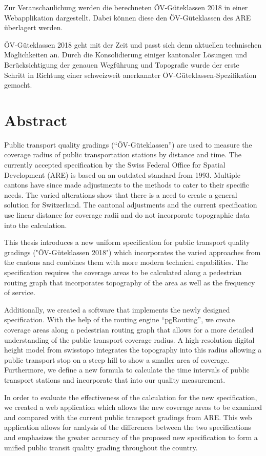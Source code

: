 Zur Veranschaulichung werden die berechneten ÖV-Güteklassen 2018 in einer
Webapplikation dargestellt.
Dabei können diese den ÖV-Güteklassen des ARE überlagert werden.

ÖV-Güteklassen 2018 geht mit der Zeit und passt sich denn aktuellen technischen Möglichkeiten an.
Durch die Konsolidierung einiger kantonaler Lösungen und Berücksichtigung der genauen Wegführung und Topografie wurde der erste Schritt in Richtung einer schweizweit anerkannter ÖV-Güteklassen-Spezifikation gemacht.

\cleardoublepage

\chapter*{Abstract}

Public transport quality gradings ("`ÖV-Güteklassen"') are used to measure the coverage radius of public transportation stations by distance and time.
The currently accepted specification by the Swiss Federal Office for Spatial Development (ARE) is based on an outdated standard from 1993.
Multiple cantons have since made adjustments to the methods to cater to their specific needs.
The varied alterations show that there is a need to create a general solution for Switzerland.
The cantonal adjustments and the current specification use linear distance for coverage radii and do not incorporate topographic data into the calculation.

This thesis introduces a new uniform specification for public transport quality gradings ("ÖV-Güteklassen 2018") which incorporates the varied approaches from the cantons and combines them with more modern technical capabilities.
The specification requires the coverage areas to be calculated along a pedestrian routing graph that incorporates topography of the area as well as the frequency of service.

Additionally, we created a software that implements the newly designed specification.
With the help of the routing engine "`pgRouting"', we create coverage areas along a pedestrian routing graph that allows for a more detailed understanding of the public transport coverage radius.
A high-resolution digital height model from swisstopo integrates the topography into this radius allowing a public transport stop on a steep hill to show a smaller area of coverage.
Furthermore, we define a new formula to calculate the time intervals of public transport stations and incorporate that into our quality measurement.

In order to evaluate the effectiveness  of the calculation for the new specification, we created a web application which allows the new coverage areas to be examined and compared with the current public transport gradings from ARE.
This web application allows for analysis of the differences between the two specifications and emphasizes the greater accuracy of the proposed new specification to form a unified public transit quality grading throughout the country.